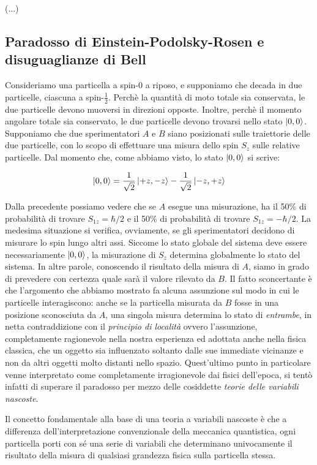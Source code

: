 (...)

\subsection{Paradosso di Einstein-Podolsky-Rosen e disuguaglianze di Bell}

	Consideriamo una particella a spin-0 a riposo, e supponiamo che decada in due particelle, ciascuna a spin-$\tfrac{1}{2}$. Perch\`e la quantit\`a di moto totale sia conservata, le due particelle devono muoversi in direzioni opposte. Inoltre, perch\`e il momento angolare totale sia conservato, le due particelle devono trovarsi nello stato $\ket{0, 0}$. Supponiamo che due sperimentatori $A$ e $B$ siano posizionati sulle traiettorie delle due particelle, con lo scopo di effettuare una misura dello spin $S_z$ sulle relative particelle.
Dal momento che, come abbiamo visto, lo stato $\ket{0, 0}$ si scrive:

	\[
		\ket{0, 0}  = \frac{1}{\sqrt{2}} \ket{+z, -z} - \frac{1}{\sqrt{2}} \ket{-z, +z}
	\]

Dalla precedente possiamo vedere che se $A$ esegue una misurazione, ha il 50\% di probabilit\`a di trovare $S_{1z} = \hbar / 2$ e il 50\% di probabilit\`a di trovare $S_{1z} = - \hbar / 2$. La medesima situazione si verifica, ovviamente, se gli sperimentatori decidono di misurare lo spin lungo altri assi. Siccome lo stato globale del sistema deve essere necessariamente $\ket{0, 0}$, la misurazione di $S_z$ determina globalmente lo stato del sistema. In altre parole, conoscendo il risultato della misura di $A$, siamo in grado di prevedere con certezza quale sar\`a il valore rilevato da $B$. Il fatto sconcertante \`e che l'argomento che abbiamo mostrato fa alcuna assunzione sul modo in cui le particelle interagiscono: anche se la particella misurata da $B$ fosse in una posizione sconosciuta da $A$, una singola misura determina lo stato di \textit{entrambe}, in netta contraddizione con il \textit{principio di localit\`a} ovvero l'assunzione, completamente ragionevole nella nostra esperienza ed adottata anche nella fisica classica, che un oggetto sia influenzato soltanto dalle sue immediate vicinanze e non da altri oggetti molto distanti nello spazio. 
Quest'ultimo punto in particolare venne interpretato come completamente irragionevole dai fisici dell'epoca, si tent\`o infatti di superare il paradosso per mezzo delle cosiddette \textit{teorie delle variabili nascoste}.

Il concetto fondamentale alla base di una teoria a variabili nascoste \`e che a differenza dell'interpretazione convenzionale della meccanica quantistica, ogni particella porti con s\'e una serie di variabili che determinano univocamente il risultato della misura di qualsiasi grandezza fisica sulla particella stessa.

